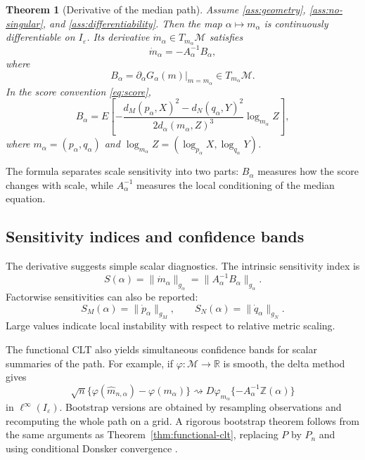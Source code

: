 \documentclass[11pt]{article}
\newtheorem{theorem}{Theorem}
\newcommand{\M}{\mathcal M}
\newcommand{\R}{\mathbb R}
\newcommand{\eps}{\varepsilon}
\newcommand{\1}{\mathbf{1}}
\begin{document}
\begin{theorem}[Derivative of the median path]\label{thm:path-derivative}
Assume \ref{ass:geometry}, \ref{ass:no-singular}, and \ref{ass:differentiability}.  Then the map $\alpha\mapsto m_\alpha$ is continuously differentiable on $I_\eps$.  Its derivative $\dot m_\alpha\in T_{m_\alpha}\M$ satisfies
\begin{equation}\label{eq:path-derivative}
 \dot m_\alpha=-A_\alpha^{-1}B_\alpha,
\end{equation}
where
\[
 B_\alpha=\partial_\alpha G_\alpha(m)\big|_{m=m_\alpha}\in T_{m_\alpha}\M.
\]
In the score convention \eqref{eq:score},
\begin{equation}\label{eq:Balpha}
 B_\alpha
 =
 E\left[
 -\frac{d_M(p_\alpha,X)^2-d_N(q_\alpha,Y)^2}
 {2d_\alpha(m_\alpha,Z)^3}
 \log_{m_\alpha}Z
 \right],
\end{equation}
where $m_\alpha=(p_\alpha,q_\alpha)$ and $\log_{m_\alpha}Z=(\log_{p_\alpha}X,\log_{q_\alpha}Y)$.
\end{theorem}



The formula separates scale sensitivity into two parts: $B_\alpha$ measures how
the score changes with scale, while $A_\alpha^{-1}$ measures the local
conditioning of the median equation.

\subsection{Sensitivity indices and confidence bands}
The derivative suggests simple scalar diagnostics.  The intrinsic sensitivity
index is
\begin{equation}\label{eq:sensitivity-index}
 S(\alpha)=\|\dot m_\alpha\|_{g_\alpha}
 =\|A_\alpha^{-1}B_\alpha\|_{g_\alpha}.
\end{equation}
Factorwise sensitivities can also be reported:
\[
 S_M(\alpha)=\|\dot p_\alpha\|_{g_M},
 \qquad
 S_N(\alpha)=\|\dot q_\alpha\|_{g_N}.
\]
Large values indicate local instability with respect to relative metric scaling.



The functional CLT also yields simultaneous confidence bands for scalar summaries of the path.  For example, if $\varphi:\M\to\R$ is smooth, the delta method gives
\[
 \sqrt n\{\varphi(\widehat m_{n,\alpha})-\varphi(m_\alpha)\}
 \rightsquigarrow
 D\varphi_{m_\alpha}\{-A_\alpha^{-1}\mathbb Z(\alpha)\}
\]
in $\ell^\infty(I_\eps)$.  Bootstrap versions are obtained by resampling observations and recomputing the whole path on a grid. A rigorous bootstrap theorem follows from the same arguments as Theorem~\ref{thm:functional-clt}, replacing $P$ by $P_n$ and using conditional Donsker convergence \citep{bickel_1981_AsymptoticTheoryBootstrap, vandervaart_1996_WeakConvergenceEmpirical, bhattacharya_2016_OmnibusCLTsFrechet}.
\end{document}
